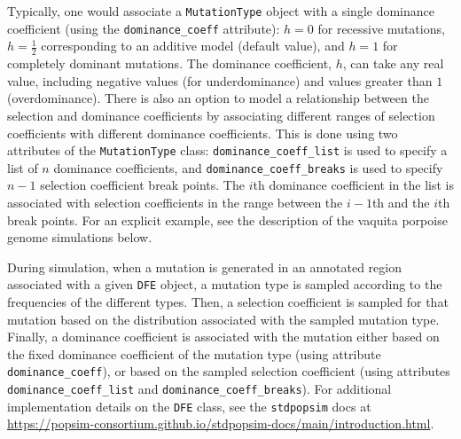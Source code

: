 \documentclass[hidelinks]{article}
\newcommand{\stdpopsim}{\texttt{stdpopsim}\xspace}
\begin{document}
    Typically, one would associate a \texttt{MutationType} object with a single dominance coefficient (using the \texttt{dominance\_coeff} attribute):
    $h=0$ for recessive mutations, $h=\frac 12$ corresponding to an additive model (default value), and $h=1$ for completely dominant mutations.
    The dominance coefficient, $h$,  can take any real value, including negative values (for underdominance)
    and values greater than $1$ (overdominance).
    There is also an option to model a relationship between the selection and dominance coefficients
    by associating different ranges of selection coefficients with different dominance coefficients.
    This is done using two attributes of the \texttt{MutationType} class:
    \texttt{dominance\_coeff\_list} is used to specify a list of $n$ dominance coefficients,
    and \texttt{dominance\_coeff\_breaks} is used to specify $n-1$ selection coefficient break points.
    The $i$th dominance coefficient in the list is associated with selection coefficients in the range
    between the $i-1$th and the $i$th break points.
    For an explicit example, see the description of the vaquita porpoise genome simulations below.
    
    During simulation, when a mutation is generated in an annotated region associated with a given \texttt{DFE} object,
    a mutation type is sampled according to the frequencies of the different types.
    Then, a selection coefficient is sampled for that mutation based on the distribution associated with the sampled mutation type.
    Finally, a dominance coefficient is associated with the mutation either based on the fixed dominance coefficient of the mutation type
    (using attribute \texttt{dominance\_coeff}), or based on the sampled selection coefficient
    (using attributes \texttt{dominance\_coeff\_list} and \texttt{dominance\_coeff\_breaks}).    
    For additional implementation details on the \texttt{DFE} class, see the {\stdpopsim docs} at
    \url{https://popsim-consortium.github.io/stdpopsim-docs/main/introduction.html}.
    
\end{document}

